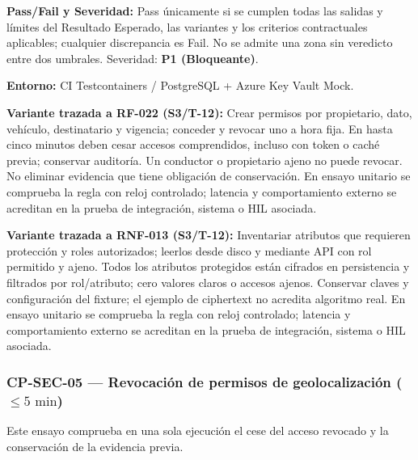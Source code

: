 \par\noindent\textbf{Pass/Fail y Severidad:} Pass únicamente si se cumplen todas las salidas y límites del Resultado Esperado, las variantes y los criterios contractuales aplicables; cualquier discrepancia es Fail. No se admite una zona sin veredicto entre dos umbrales. Severidad: \textbf{P1 (Bloqueante)}.\par
\par\noindent\textbf{Entorno:} CI Testcontainers / PostgreSQL + Azure Key Vault Mock.\par







\par\noindent\textbf{Variante trazada a RF-022 (S3/T-12):} Crear permisos por propietario, dato, vehículo, destinatario y vigencia; conceder y revocar uno a hora fija. En hasta cinco minutos deben cesar accesos comprendidos, incluso con token o caché previa; conservar auditoría. Un conductor o propietario ajeno no puede revocar. No eliminar evidencia que tiene obligación de conservación. En ensayo unitario se comprueba la regla con reloj controlado; latencia y comportamiento externo se acreditan en la prueba de integración, sistema o HIL asociada.\par

\par\noindent\textbf{Variante trazada a RNF-013 (S3/T-12):} Inventariar atributos que requieren protección y roles autorizados; leerlos desde disco y mediante API con rol permitido y ajeno. Todos los atributos protegidos están cifrados en persistencia y filtrados por rol/atributo; cero valores claros o accesos ajenos. Conservar claves y configuración del fixture; el ejemplo de ciphertext no acredita algoritmo real. En ensayo unitario se comprueba la regla con reloj controlado; latencia y comportamiento externo se acreditan en la prueba de integración, sistema o HIL asociada.\par
\subsubsection*{CP-SEC-05 — Revocación de permisos de geolocalización (\(\le 5\text{ min}\))}\label{sec:9-cp-sec-05}
Este ensayo comprueba en una sola ejecución el cese del acceso revocado y la conservación de la evidencia previa.

